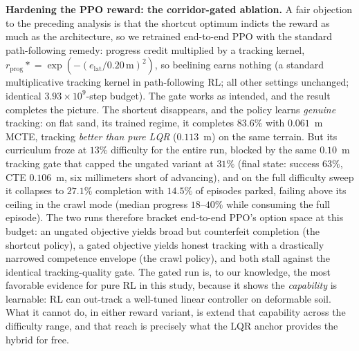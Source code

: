 \documentclass[conference]{IEEEtran}
\begin{document}
\vspace{1mm}
\noindent\textbf{Hardening the PPO reward: the corridor-gated ablation.} A fair objection to the preceding analysis is that the shortcut optimum indicts the reward as much as the architecture, so we retrained end-to-end PPO with the standard path-following remedy: progress credit multiplied by a tracking kernel, $r_{\text{prog}} \mathrel{*}= \exp(-(e_{\text{lat}}/0.20\,\text{m})^2)$, so beelining earns nothing (a standard multiplicative tracking kernel in path-following RL; all other settings unchanged; identical $3.93\times10^9$-step budget). The gate works as intended, and the result completes the picture. The shortcut disappears, and the policy learns \emph{genuine} tracking: on flat sand, its trained regime, it completes $83.6\%$ with $0.061$~m MCTE, tracking \emph{better than pure LQR} ($0.113$~m) on the same terrain. But its curriculum froze at $13\%$ difficulty for the entire run, blocked by the same $0.10$~m tracking gate that capped the ungated variant at $31\%$ (final state: success $63\%$, CTE $0.106$~m, six millimeters short of advancing), and on the full difficulty sweep it collapses to $27.1\%$ completion with $14.5\%$ of episodes parked, failing above its ceiling in the crawl mode (median progress $18$--$40\%$ while consuming the full episode). The two runs therefore bracket end-to-end PPO's option space at this budget: an ungated objective yields broad but counterfeit completion (the shortcut policy), a gated objective yields honest tracking with a drastically narrowed competence envelope (the crawl policy), and both stall against the identical tracking-quality gate. The gated run is, to our knowledge, the most favorable evidence for pure RL in this study, because it shows the \emph{capability} is learnable: RL can out-track a well-tuned linear controller on deformable soil. What it cannot do, in either reward variant, is extend that capability across the difficulty range, and that reach is precisely what the LQR anchor provides the hybrid for free.
\end{document}
